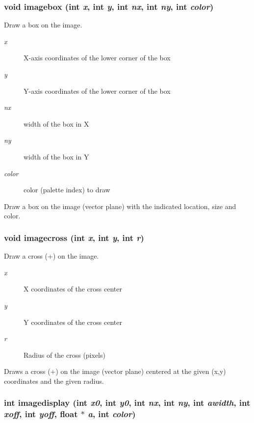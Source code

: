 \subsubsection{\setlength{\rightskip}{0pt plus 5cm}void imagebox (int {\em x}, int {\em y}, int {\em nx}, int {\em ny}, int {\em color})}\label{xtvutils_8c_a176}


Draw a box on the image. 

\begin{Desc}
\item[Parameters:]
\begin{description}
\item[{\em x}]X-axis coordinates of the lower corner of the box \item[{\em y}]Y-axis coordinates of the lower corner of the box \item[{\em nx}]width of the box in X \item[{\em ny}]width of the box in Y \item[{\em color}]color (palette index) to draw\end{description}
\end{Desc}
Draw a box on the image (vector plane) with the indicated location, size and color. 
\subsubsection{\setlength{\rightskip}{0pt plus 5cm}void imagecross (int {\em x}, int {\em y}, int {\em r})}\label{xtvutils_8c_a177}


Draw a cross (+) on the image. 

\begin{Desc}
\item[Parameters:]
\begin{description}
\item[{\em x}]X coordinates of the cross center \item[{\em y}]Y coordinates of the cross center \item[{\em r}]Radius of the cross (pixels)\end{description}
\end{Desc}
Draws a cross (+) on the image (vector plane) centered at the given (x,y) coordinates and the given radius. 
\subsubsection{\setlength{\rightskip}{0pt plus 5cm}int imagedisplay (int {\em x0}, int {\em y0}, int {\em nx}, int {\em ny}, int {\em awidth}, int {\em xoff}, int {\em yoff}, float $\ast$ {\em a}, int {\em color})}\label{xtvutils_8c_a170}


